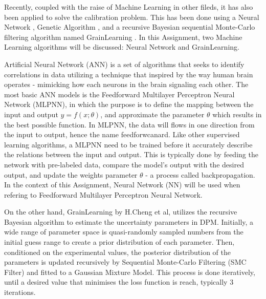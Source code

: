 \documentclass[../BachelorAssignment.tex]{subfiles}
\begin{document}
Recently, coupled with the raise of Machine Learning in other fileds, it has also been applied to solve the calibration problem. This has been done using a Neural Network \cite{nn-calibration, NN-GA, NN-coarse}, Genetic Algorithm \cite{ga-calibration}, and a recursive Bayesian sequential Monte-Carlo filtering algorithm named GrainLearning \cite{grainLearning}. In this Assignment, two Machine Learning algorithms will be discussed: Neural Network and GrainLearning. 


Artificial Neural Network (ANN) is a set of algorithms that seeks to identify correlations in data utilizing a technique that inspired by the way human brain operates - mimicking how each neurons in the brain signaling each other. The most basic ANN models is the Feedforward Multilayer Perceptron Neural Network (MLPNN), in which the purpose is to define the mapping between the input and output \(y = f(x;\theta)\), and approximate the parameter \(\theta\) which results in the best possible function. In MLPNN, the data will flows in one direction from the input to output, hence the name feedforwcanard. Like other supervised learning algorithms, a MLPNN need to be trained before it  accurately describe the relations between the input and output. This is typically done by feeding the network with pre-labeled data, compare the model's output with the desired output, and update the weights parameter \(\theta\) - a process called backpropagation. In the context of this Assignment, Neural Network (NN) will be used when refering to Feedforward Multilayer Perceptron Neural Network. 

On the other hand, GrainLearning by H.Cheng et al, utilizes the recursive Bayesian algorithm to estimate the uncertainty parameters in DPM. Initially, a wide range of parameter space is quasi-randomly sampled numbers from the initial guess range to create a prior distribution of each parameter. Then, conditioned on the experimental values, the posterior distribution of the parameters is updated recursively by Sequential Monte-Carlo Filtering (SMC Filter) and fitted to a Gaussian Mixture Model. This process is done iteratively, until a desired value that minimises the loss function is reach, typically 3 iterations. 

\end{document}
